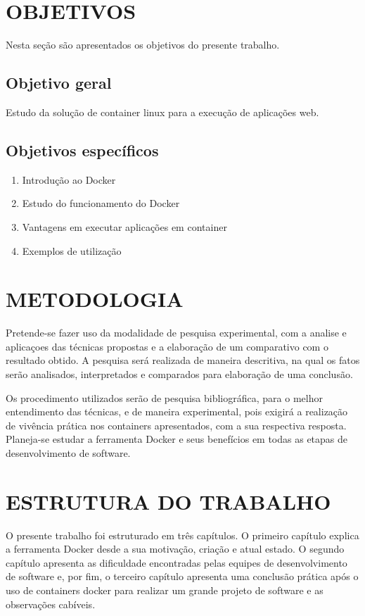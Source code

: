 \documentclass[
	12pt,				%
	openright,			%
	oneside,			%
	a4paper,			%
	chapter=TITLE,		%
	section=TITLE,		%
	english,			%
	french,				%
	spanish,			%
	brazil				%
	]{abntex2}
\begin{document}
\section{OBJETIVOS}

Nesta seção são apresentados os objetivos do presente trabalho.

\subsection{Objetivo geral}

Estudo da solução de container linux para a execução de aplicações web.

\subsection{Objetivos específicos}

\begin{enumerate}
	\item{Introdução ao Docker}
	\item{Estudo do funcionamento do Docker}
	\item{Vantagens em executar aplicações em container}
	\item{Exemplos de utilização}
\end{enumerate}

\section{METODOLOGIA}

Pretende-se fazer uso da modalidade de pesquisa experimental, com a analise e aplicaçoes das técnicas propostas e a elaboração de um comparativo com o resultado obtido. A pesquisa será realizada de maneira descritiva, na qual os fatos serão analisados, interpretados e comparados para elaboração de uma conclusão.

Os procedimento utilizados serão de pesquisa bibliográfica, para o melhor entendimento das técnicas, e de maneira experimental, pois exigirá a realização de vivência prática nos containers apresentados, com a sua respectiva resposta. Planeja-se estudar a ferramenta Docker e seus benefícios em todas as etapas de desenvolvimento de software.  

\section{ESTRUTURA DO TRABALHO}

O presente trabalho foi estruturado em três capítulos. O primeiro capítulo explica a ferramenta Docker desde a sua motivação, criação e atual estado. O segundo capítulo apresenta as dificuldade encontradas pelas equipes de desenvolvimento de software e, por fim, o terceiro capítulo apresenta uma conclusão prática após o uso de containers docker para realizar um grande projeto de software e as observações cabíveis.
\end{document}
